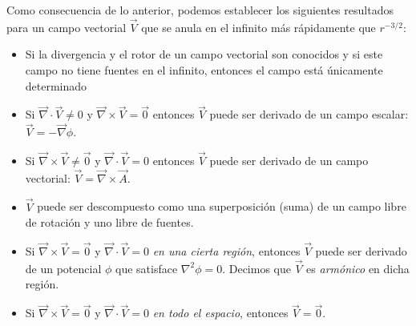 Como consecuencia de lo anterior, podemos establecer los siguientes resultados
para un campo vectorial $\vec V$ que se anula en el infinito más
rápidamente que $r^{-3/2}$:
\begin{itemize}
\item Si la divergencia y el rotor de un campo vectorial son conocidos y si
este campo no tiene fuentes en el infinito, entonces el campo está únicamente
determinado
\item Si $\vec\nabla\cdot\vec V\neq 0$ y $\vec\nabla\times\vec V=\vec 0$
entonces $\vec V$ puede ser derivado de un campo escalar: $\vec
V=-\vec\nabla\phi$.
\item Si $\vec\nabla\times\vec V\neq \vec 0$ y $\vec\nabla\cdot\vec V= 0$
entonces $\vec V$ puede ser derivado de un campo vectorial: $\vec
V=\vec\nabla\times\vec A$.
\item $\vec{V}$ puede ser descompuesto como una superposición (suma) de un
campo libre de rotación y uno libre de fuentes.
\item Si $\vec\nabla\times\vec V=\vec 0$ y $\vec\nabla\cdot\vec V= 0$ \textit{en
una cierta región}, entonces $\vec V$ puede ser derivado de un potencial $\phi$
que satisface $\nabla^2\phi=0$. Decimos que $\vec V$ es \textit{armónico} en
dicha región.
\item Si $\vec\nabla\times\vec V=\vec 0$ y $\vec\nabla\cdot\vec V= 0$ \textit{en
todo el espacio}, entonces $\vec V=\vec 0$.
\end{itemize}


